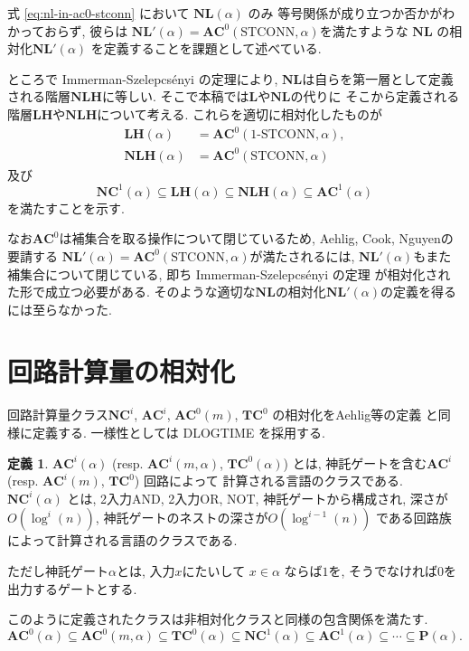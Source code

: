 \documentclass[11pt,a4paper]{jsarticle}
\theoremstyle{definition}
\newtheorem{definition}[theorem]{定義}
\theoremstyle{remark}
\newcommand{\classfont}{\mathbf}
\newcommand{\AC}{\classfont{AC}}
\newcommand{\TC}{\classfont{TC}}
\newcommand{\NC}{\classfont{NC}}
\renewcommand{\L}{\classfont{L}}
\newcommand{\NL}{\classfont{NL}}
\renewcommand{\P}{\classfont{P}}
\newcommand{\LH}{\classfont{LH}}
\newcommand{\NLH}{\classfont{NLH}}
\newcommand{\probfont}{\text}
\newcommand{\oneSTCONN}{\probfont{1-STCONN}}
\newcommand{\STCONN}{\probfont{STCONN}}
\begin{document}
式 \eqref{eq:nl-in-ac0-stconn} において $\NL(\alpha)$ のみ
等号関係が成り立つか否かがわかっておらず, 
彼らは $\NL'(\alpha) = \AC^0(\STCONN, \alpha)$を満たすような
$\NL$ の相対化$\NL'(\alpha)$ を定義することを課題として述べている.

ところで Immerman-Szelepcs{\'e}nyi の定理\cite{immerman1988nondeterministic,szelepcsenyi1988method}により, 
$\NL$は自らを第一層として定義される階層$\NLH$に等しい. 
そこで本稿では$\L$や$\NL$の代りに
そこから定義される階層$\LH$や$\NLH$について考える. 
これらを適切に相対化したものが
\begin{align*}
 \LH(\alpha) &= \AC^0 (\oneSTCONN, \alpha),
 \\
 \NLH(\alpha) &= \AC^0(\STCONN, \alpha)
\end{align*}
及び
\begin{equation*}
 \NC^1(\alpha) \subseteq \LH(\alpha) \subseteq \NLH(\alpha) \subseteq \AC^1(\alpha)
\end{equation*}
を満たすことを示す.

なお$\AC^0$は補集合を取る操作について閉じているため,
Aehlig, Cook, Nguyenの要請する
$\NL'(\alpha) = \AC^0(\STCONN, \alpha)$が満たされるには, 
$\NL' (\alpha)$もまた補集合について閉じている, 
即ち Immerman-Szelepcs{\'e}nyi の定理 
\cite{immerman1988nondeterministic,szelepcsenyi1988method}
が相対化された形で成立つ必要がある. 
そのような適切な$\NL$の相対化$\NL' (\alpha)$の定義を得るには至らなかった. 

\section{回路計算量の相対化}

回路計算量クラス$\NC^i$, $\AC^i$, $\AC^0(m)$, $\TC^0$ の相対化をAehlig等の定義
\cite{aehlig2007relativizing} と同様に定義する.
一様性としては DLOGTIME を採用する.
\begin{definition}
$\AC^i(\alpha)$ (resp. $\AC^i(m, \alpha)$, $\TC^0(\alpha)$) とは,
神託ゲートを含む$\AC^i$ (resp. $\AC^i(m)$, $\TC^0$) 回路によって
計算される言語のクラスである.
$\NC^i(\alpha)$ とは, 2入力AND, 2入力OR, NOT, 神託ゲートから構成され,
深さが$O(\log^i(n))$, 神託ゲートのネストの深さが$O(\log^{i-1}(n))$
である回路族によって計算される言語のクラスである.
\end{definition}
ただし神託ゲート$\alpha$とは, 入力$x$にたいして $x \in \alpha$ ならば$1$を, 
そうでなければ$0$を出力するゲートとする.

このように定義されたクラスは非相対化クラスと同様の包含関係を満たす.
\begin{equation*}
 \AC^0(\alpha) \subseteq \AC^0(m, \alpha) \subseteq \TC^0(\alpha) 
 \subseteq \NC^1(\alpha) \subseteq \AC^1(\alpha) \subseteq \cdots \subseteq \P(\alpha).
\end{equation*}
\end{document}
